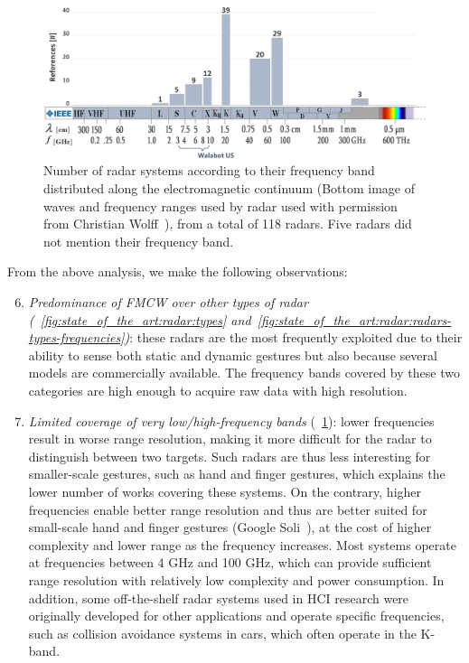 \begin{figure}[t]
    \centering
    \includegraphics[width=\textwidth]{Figures/StateOfTheArt/Radar/IEEE-bands.pdf}
    \vspace{-12pt}
    \caption{Number of radar systems according to their frequency band~\cite{IEEE:2020} distributed along the electromagnetic continuum (Bottom image of waves and frequency ranges used by radar used with permission from Christian Wolff~\cite{Wolff:2022}), from a total of 118 radars. Five radars did not mention their frequency band.}
    \label{fig:state_of_the_art:IEEE}
\end{figure}

From the above analysis, we make the following observations:
\begin{enumerate}
\setcounter{enumi}{5}
    \item \textit{Predominance of FMCW over other types of radar (\fig~\ref{fig:state_of_the_art:radar:types} and~\ref{fig:state_of_the_art:radar:radars-types-frequencies})}: these radars are the most frequently exploited due to their ability to sense both static and dynamic gestures but also because several models are commercially available. The frequency bands covered by these two categories are high enough to acquire raw data with high resolution.
    \item \textit{Limited coverage of very low/high-frequency bands} (\fig~\ref{fig:state_of_the_art:IEEE}): lower frequencies result in worse range resolution, making it more difficult for the radar to distinguish between two targets. Such radars are thus less interesting for smaller-scale gestures, such as hand and finger gestures, which explains the lower number of works covering these systems. On the contrary, higher frequencies enable better range resolution and thus are better suited for small-scale hand and finger gestures (\eg Google Soli~\cite{Lien:2016,Wang:2016}), at the cost of higher complexity and lower range as the frequency increases. Most systems operate at frequencies between 4 GHz and 100 GHz, which can provide sufficient range resolution with relatively low complexity and power consumption. In addition, some off-the-shelf radar systems used in HCI research were originally developed for other applications and operate specific frequencies, such as collision avoidance systems in cars, which often operate in the K-band. 
\end{enumerate}


